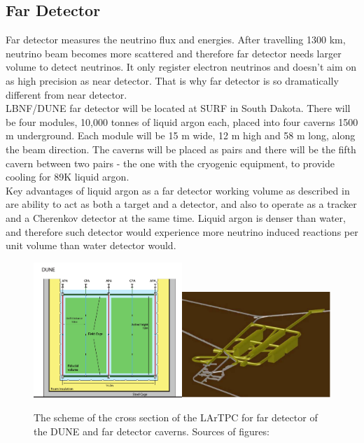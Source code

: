 \subsection{Far Detector}

Far detector measures the neutrino flux and energies. After travelling 1300 km, neutrino beam becomes more scattered and therefore far detector needs larger volume to detect neutrinos. It only register electron neutrinos and doesn't aim on as high precision as near detector. That is why far detector is so dramatically different from near detector.\\
LBNF/DUNE far detector will be located at SURF in South Dakota. There will be four modules, 10,000 tonnes of liquid argon each, placed into four caverns 1500 m underground. Each module will be 15 m wide, 12 m high and 58 m long, along the beam direction. The caverns will be placed as pairs and there will be the fifth cavern between two pairs - the one with the cryogenic equipment, to provide cooling for 89K liquid argon.\\ 
Key advantages of liquid argon as a far detector working volume as described in \cite{ref_aboutLAr} are ability to act as both a target and a detector, and also to operate as a tracker and a Cherenkov detector at the same time. Liquid argon is denser than water, and therefore such detector would experience more neutrino induced reactions per unit volume than water detector would. \\



\begin{figure}
\caption{The scheme of the cross section of the LArTPC for far detector of the DUNE and far detector caverns. Sources of figures: \cite{ref_LBNFdoc_volume-detectors}}
\label{fig:farDetector_TPC}
\centering
\includegraphics[width=0.5\textwidth, keepaspectratio=true]{figs/farDetector_TPC.png}\includegraphics[width=0.5\textwidth, keepaspectratio=true]{figs/farDetector_Caverns.png}
\end{figure}

